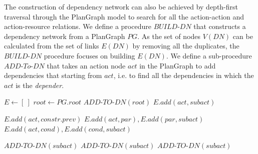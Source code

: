The construction of dependency network can also be achieved by depth-first traversal through the PlanGraph model to search for all the action-action and action-resource relations. We define a procedure $BUILD\textrm{-}DN$ that constructs a dependency network from a PlanGraph $PG$. As the set of nodes $V(DN)$ can be calculated from the set of links $E(DN)$ by removing all the duplicates, the $BUILD\textrm{-}DN$ procedure focuses on building $E(DN)$. We define a sub-procedure $ADD\textrm{-}To\textrm{-}DN$ that takes an action node $act$ in the PlanGraph to add dependencies that starting from $act$, i.e. to find all the dependencies in which the $act$ is the \emph{depender}.

{\footnotesize
\begin{algorithm}
\begin{algorithmic}[1]
	\State $E\gets [\:]$
	\State $root\gets PG.root$
	\State $ADD\textrm{-}TO\textrm{-}DN(root)$
\EndProcedure
{}
   		\State $E.add(act, subact)$
	\EndFor

   				\State $E.add(act, constr.prev)$ 
   			\EndIf
		\EndFor
   				\State $E.add(act, par), E.add(par, subact)$
			\EndFor
		\EndFor
   				\State $E.add(act, cond), E.add(cond, subact)$
			\EndFor
		\EndFor
   	\EndIf

   			\State $ADD\textrm{-}TO\textrm{-}DN(subact)$
		\EndFor
	\EndFor
   			\State $ADD\textrm{-}TO\textrm{-}DN(subact)$
		\EndFor
	\EndFor
   		\State $ADD\textrm{-}TO\textrm{-}DN(subact)$
	\EndFor
\EndProcedure
\end{algorithmic}
\end{algorithm}
}

